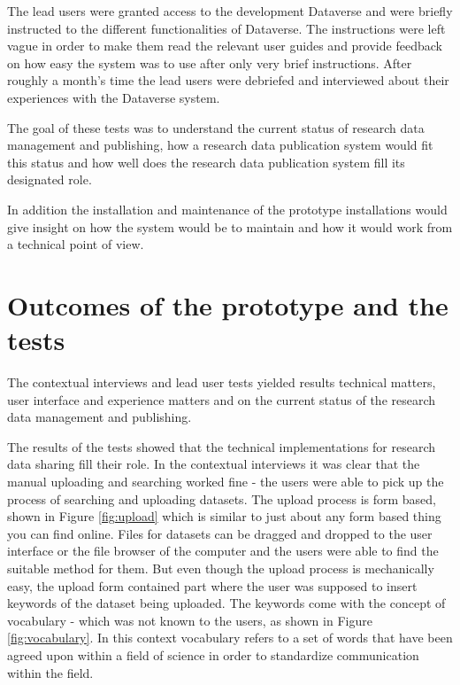 The lead users were granted access to the development Dataverse and were
briefly instructed to the different functionalities of Dataverse. The
instructions were left vague in order to make them read the relevant user
guides and provide feedback on how easy the system was to use after only very
brief instructions. After roughly a month's time the lead users were debriefed
and interviewed about their experiences with the Dataverse system.

The goal of these tests was to understand the current status of research data
management and publishing, how a research data publication system would fit
this status and how well does the research data publication system fill its
designated role.

In addition the installation and maintenance of the prototype installations
would give insight on how the system would be to maintain and how it would work
from a technical point of view.

\section{Outcomes of the prototype and the tests}
\label{sec:prototype_outcomes}

The contextual interviews and lead user tests yielded results technical matters,
user interface and experience matters and on the current status of the research
data management and publishing.

The results of the tests showed that the technical implementations for research
data sharing fill their role. In the contextual interviews it was clear that
the manual uploading and searching worked fine - the users were able to pick up
the process of searching and uploading datasets. The upload process is form
based, shown in Figure \ref{fig:upload} which is similar to just about any
form based thing you can find online. Files for datasets can be dragged and
dropped to the user interface or the file browser of the computer and the users
were able to find the suitable method for them. But even
though the upload process is mechanically easy, the upload form contained part
where the user was supposed to insert keywords of the dataset being uploaded.
The keywords come with the concept of vocabulary - which was not known to the
users, as shown in Figure \ref{fig:vocabulary}. In this context vocabulary
refers to a set of words that have been agreed upon within a field of science
in order to standardize communication within the field.

